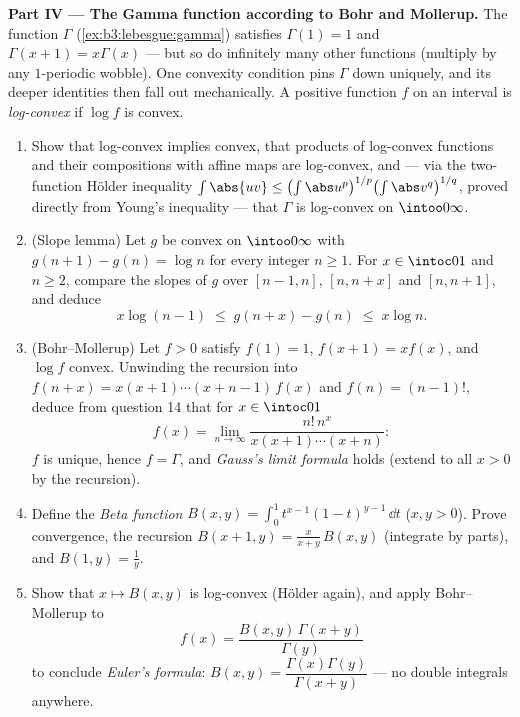 \begin{problem}
\medskip
\noindent\textbf{Part IV --- The Gamma function according to
Bohr and Mollerup.} The function $\Gamma$
(\cref{ex:b3:lebesgue:gamma}) satisfies $\Gamma(1) = 1$ and
$\Gamma(x+1) = x\Gamma(x)$ --- but so do infinitely many other
functions (multiply by any $1$-periodic wobble). One convexity
condition pins $\Gamma$ down uniquely, and its deeper
identities then fall out mechanically. A positive function $f$
on an interval is \emph{log-convex} if $\log f$ is convex.
\begin{enumerate}[resume]
  \item Show that log-convex implies convex, that products of
        log-convex functions and their compositions with affine
        maps are log-convex, and --- via the two-function
        H\"older inequality $\int\abs{uv} \leq
        \bigl(\int\abs u^p\bigr)^{1/p}\bigl(\int\abs
        v^q\bigr)^{1/q}$, proved directly from Young's
        inequality --- that $\Gamma$ is log-convex on
        $\intoo0\infty$.
  \item (Slope lemma) Let $g$ be convex on $\intoo0\infty$
        with $g(n+1) - g(n) = \log n$ for every integer $n
        \geq 1$. For $x \in \intoc01$ and $n \geq 2$, compare
        the slopes of $g$ over $[n-1, n]$, $[n, n+x]$ and
        $[n, n+1]$, and deduce
        \[
        x\log(n-1) \;\leq\; g(n + x) - g(n) \;\leq\; x\log n .
        \]
  \item (Bohr--Mollerup) Let $f > 0$ satisfy $f(1) = 1$,
        $f(x+1) = xf(x)$, and $\log f$ convex. Unwinding the
        recursion into $f(n + x) = x(x+1)\cdots(x + n -
        1)\,f(x)$ and $f(n) = (n-1)!$, deduce from question 14
        that for $x \in \intoc01$
        \[
        f(x) = \lim_{n\to\infty}
        \frac{n!\,n^x}{x(x+1)\cdots(x+n)} :
        \]
        $f$ is unique, hence $f = \Gamma$, and \emph{Gauss's
        limit formula} holds (extend to all $x > 0$ by the
        recursion).
  \item Define the \emph{Beta function} $B(x, y) =
        \int_0^1t^{x-1}(1-t)^{y-1}\,\dd t$ ($x, y > 0$). Prove
        convergence, the recursion $B(x+1, y) =
        \frac{x}{x+y}\,B(x, y)$ (integrate by parts), and
        $B(1, y) = \frac1y$.
  \item Show that $x \mapsto B(x, y)$ is log-convex (H\"older
        again), and apply Bohr--Mollerup to
        \[
        f(x) = \frac{B(x, y)\,\Gamma(x + y)}{\Gamma(y)}
        \]
        to conclude \emph{Euler's formula}: $B(x, y) =
        \dfrac{\Gamma(x)\Gamma(y)}{\Gamma(x+y)}$ --- no double
        integrals anywhere.

\end{enumerate}
\end{problem}

